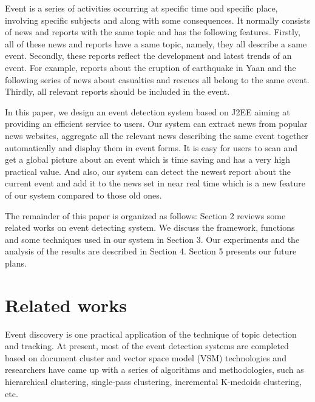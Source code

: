 \documentclass[conference]{IEEEtran}
\begin{document}
Event is a series of activities occurring at specific time and specific place, involving specific subjects and along with some consequences. It normally consists of news and reports with the same topic and has the following features. Firstly, all of these news and reports have a same topic, namely, they all describe a same event. Secondly, these reports reflect the development and latest trends of an event. For example, reports about the eruption of earthquake in Yaan and the following series of news about casualties and rescues all belong to the same event. Thirdly, all relevant reports should be included in the event.

In this paper, we design an event detection system based on J2EE aiming at providing an efficient service to users. Our system can extract news from popular news websites, aggregate all the relevant news describing the same event together automatically and display them in event forms. It is easy for users to scan and get a global picture about an event which is time saving and has a very high practical value. And also, our system can detect the newest report about the current event and add it to the news set in near real time which is a new feature of our system compared to those old ones.

The remainder of this paper is organized as follows: Section 2 reviews some related works on event detecting system. We discuss the framework, functions and some techniques used in our system in Section 3. Our experiments and the analysis of the results are described in Section 4. Section 5 presents our future plans.


\section{Related works}

Event discovery is one practical application of the technique of topic detection and tracking. At present, most of the event detection systems are completed based on document cluster and vector space model (VSM) technologies and researchers have came up with a series of algorithms and methodologies, such as hierarchical clustering, single-pass clustering, incremental K-medoids clustering, etc.
\end{document}
